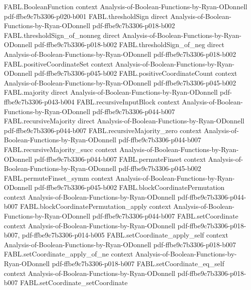 \begin{theorem}
  {FABL.BooleanFunction}
  {context}
  {Analysis-of-Boolean-Functions-by-Ryan-ODonnell}
  {pdf-ffbe9c7b3306-p020-b001}
\proofstep
  {FABL.thresholdSign}
  {direct}
  {Analysis-of-Boolean-Functions-by-Ryan-ODonnell}
  {pdf-ffbe9c7b3306-p018-b002}
\proofstep
  {FABL.thresholdSign_of_nonneg}
  {direct}
  {Analysis-of-Boolean-Functions-by-Ryan-ODonnell}
  {pdf-ffbe9c7b3306-p018-b002}
\proofstep
  {FABL.thresholdSign_of_neg}
  {direct}
  {Analysis-of-Boolean-Functions-by-Ryan-ODonnell}
  {pdf-ffbe9c7b3306-p018-b002}
\proofstep
  {FABL.positiveCoordinateSet}
  {context}
  {Analysis-of-Boolean-Functions-by-Ryan-ODonnell}
  {pdf-ffbe9c7b3306-p045-b002}
\proofstep
  {FABL.positiveCoordinateCount}
  {context}
  {Analysis-of-Boolean-Functions-by-Ryan-ODonnell}
  {pdf-ffbe9c7b3306-p045-b002}
\proofstep
  {FABL.majority}
  {direct}
  {Analysis-of-Boolean-Functions-by-Ryan-ODonnell}
  {pdf-ffbe9c7b3306-p043-b004}
\proofstep
  {FABL.recursiveInputBlock}
  {context}
  {Analysis-of-Boolean-Functions-by-Ryan-ODonnell}
  {pdf-ffbe9c7b3306-p044-b007}
\proofstep
  {FABL.recursiveMajority}
  {direct}
  {Analysis-of-Boolean-Functions-by-Ryan-ODonnell}
  {pdf-ffbe9c7b3306-p044-b007}
\proofstep
  {FABL.recursiveMajority_zero}
  {context}
  {Analysis-of-Boolean-Functions-by-Ryan-ODonnell}
  {pdf-ffbe9c7b3306-p044-b007}
\proofstep
  {FABL.recursiveMajority_succ}
  {context}
  {Analysis-of-Boolean-Functions-by-Ryan-ODonnell}
  {pdf-ffbe9c7b3306-p044-b007}
\proofstep
  {FABL.permuteFinset}
  {context}
  {Analysis-of-Boolean-Functions-by-Ryan-ODonnell}
  {pdf-ffbe9c7b3306-p045-b002}
\proofstep
  {FABL.permuteFinset_symm}
  {context}
  {Analysis-of-Boolean-Functions-by-Ryan-ODonnell}
  {pdf-ffbe9c7b3306-p045-b002}
\proofstep
  {FABL.blockCoordinatePermutation}
  {context}
  {Analysis-of-Boolean-Functions-by-Ryan-ODonnell}
  {pdf-ffbe9c7b3306-p044-b007}
\proofstep
  {FABL.blockCoordinatePermutation_apply}
  {context}
  {Analysis-of-Boolean-Functions-by-Ryan-ODonnell}
  {pdf-ffbe9c7b3306-p044-b007}
\proofstep
  {FABL.setCoordinate}
  {context}
  {Analysis-of-Boolean-Functions-by-Ryan-ODonnell}
  {pdf-ffbe9c7b3306-p018-b007,
    pdf-ffbe9c7b3306-p014-b005}
\proofstep
  {FABL.setCoordinate_apply_self}
  {context}
  {Analysis-of-Boolean-Functions-by-Ryan-ODonnell}
  {pdf-ffbe9c7b3306-p018-b007}
\proofstep
  {FABL.setCoordinate_apply_of_ne}
  {context}
  {Analysis-of-Boolean-Functions-by-Ryan-ODonnell}
  {pdf-ffbe9c7b3306-p018-b007}
\proofstep
  {FABL.setCoordinate_eq_self}
  {context}
  {Analysis-of-Boolean-Functions-by-Ryan-ODonnell}
  {pdf-ffbe9c7b3306-p018-b007}
\proofstep
  {FABL.setCoordinate_setCoordinate}

\end{theorem}
